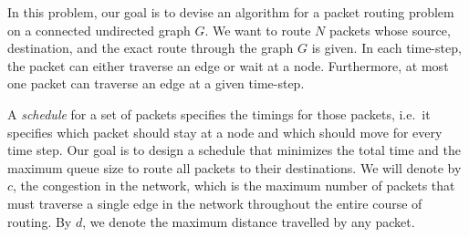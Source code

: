 \documentclass[addpoints,12pt]{exam}
\begin{document}
\begin{questions}
	
		\question In this problem, our goal is to devise an algorithm for a packet routing problem on a connected undirected graph $G$. We want to route $N$ packets whose source, destination, and the exact route through the graph $G$ is given. In each time-step, the packet can either traverse an edge or wait at a node. Furthermore, at most one packet can traverse an edge at a given time-step. 
		
		A \emph{schedule} for a set of packets specifies the timings for those packets, i.e.\ it specifies which packet should stay at a node and which should move for every time step. Our goal is to design a schedule that minimizes the total time and the maximum queue size to route all packets to their destinations. We will denote by $c$, the congestion in the network, which is the maximum number of packets that must traverse a single edge in the network throughout the entire course of routing. By $d$, we denote the maximum distance travelled by any packet.
		

\end{questions}
\end{document}
